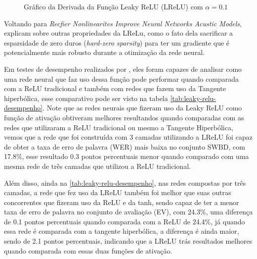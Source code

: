 \begin{figure}[h!]
    \centering
    \caption{Gráfico da Derivada da Função Leaky ReLU (LReLU) com $\alpha = 0.1$}
    \label{fig:leaky-relu-derivada}
\end{figure}

Voltando para \textit{Recfier Nonlinearites Improve Neural Networks Acustic Models}, \textcite{LeakyReLUArticle} explicam sobre outras propriedades da LReLu, como o fato dela sacrificar a esparsidade de zero duros (\textit{hard-zero sparsity}) para ter um gradiente que é potencialmente mais robusto durante a otimização da rede neural.

Em testes de desempenho realizados por \textcite{LeakyReLUArticle}, eles foram capazes de analisar como uma rede neural que faz uso dessa função pode performar quando comparada com a ReLU tradicional e também com redes que fazem uso da Tangente hiperbólica, esse comparativo pode ser visto na tabela \ref{tab:leaky-relu-desempenho}. Note que as redes neurais que fizeram uso da Leaky ReLU como função de ativação obtiveram melhores resultandos quando comparadas com as redes que utilizaram a ReLU tradicional ou mesmo a Tangente Hiperbólica, vemos que a rede que foi construída com 3 camadas utilizando a LReLU foi capaz de obter a taxa de erro de palavra (WER) mais baixa no conjunto SWBD, com 17.8\%, esse resultado 0.3 pontos percentuais menor quando comparado com uma mesma rede de três camadas que utilizou a ReLU tradicional.

Além disso, ainda na \ref{tab:leaky-relu-desempenho}, nas redes compostas por três camadas, a rede que fez uso da LReLU também foi melhor que suas outras concorrentes que fizeram uso da ReLU e da tanh, sendo capaz de ter a menor taxa de erro de palavra no conjunto de avaliação (EV), com 24.3\%, uma diferença de 0.1 pontos percentuais quando comparada com a ReLU de 24.4\%, já quando essa rede é comparada com a tangente hiperbólica, a diferença é ainda maior, sendo de 2.1 pontos percentuais, indicando que a LReLU trás resultados melhores quando comparada com essas duas funções de ativação.

